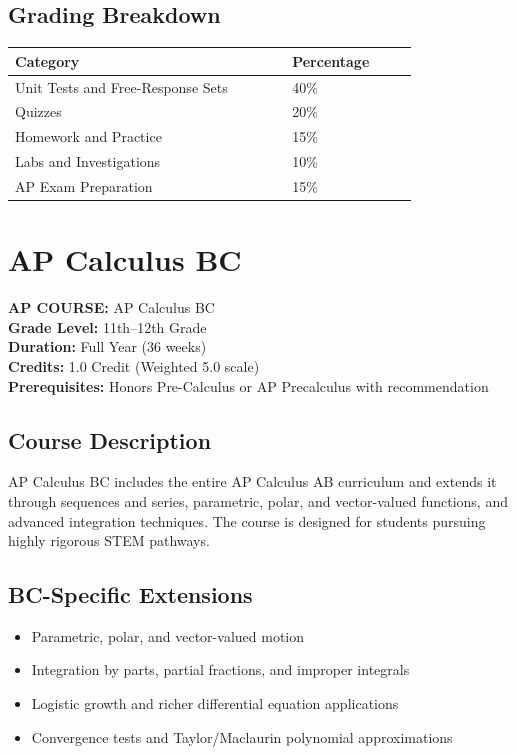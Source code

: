 \documentclass[12pt,oneside]{book}
\begin{document}
\section{Grading Breakdown}
\begin{center}
\begin{tabular}{L{0.55\linewidth}L{0.25\linewidth}}
\toprule
\textbf{Category} & \textbf{Percentage} \\
\midrule
Unit Tests and Free-Response Sets & 40\% \\
Quizzes & 20\% \\
Homework and Practice & 15\% \\
Labs and Investigations & 10\% \\
AP Exam Preparation & 15\% \\
\bottomrule
\end{tabular}
\end{center}

\chapter{AP Calculus BC}

\noindent\textbf{AP COURSE:} AP Calculus BC\\
\textbf{Grade Level:} 11th--12th Grade\\
\textbf{Duration:} Full Year (36 weeks)\\
\textbf{Credits:} 1.0 Credit (Weighted 5.0 scale)\\
\textbf{Prerequisites:} Honors Pre-Calculus or AP Precalculus with recommendation

\section{Course Description}
AP Calculus BC includes the entire AP Calculus AB curriculum and extends it through sequences and series,
parametric, polar, and vector-valued functions, and advanced integration techniques. The course is designed
for students pursuing highly rigorous STEM pathways.

\section{BC-Specific Extensions}
\begin{itemize}[leftmargin=2em]
    \item Parametric, polar, and vector-valued motion
    \item Integration by parts, partial fractions, and improper integrals
    \item Logistic growth and richer differential equation applications
    \item Convergence tests and Taylor/Maclaurin polynomial approximations
\end{itemize}
\end{document}
